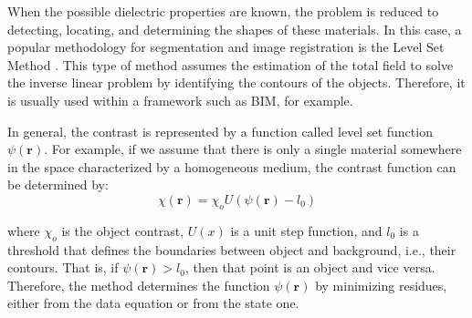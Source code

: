 			When the possible dielectric properties are known, the problem is reduced to detecting, locating, and determining the shapes of these materials. In this case, a popular methodology for segmentation and image registration is the Level Set Method \citep{osher2003level,dorn2006level}. This type of method assumes the estimation of the total field to solve the inverse linear problem by identifying the contours of the objects. Therefore, it is usually used within a framework such as BIM, for example.
			
			In general, the contrast is represented by a function called level set function $\psi(\mathbf{r})$. For example, if we assume that there is only a single material somewhere in the space characterized by a homogeneous medium, the contrast function can be determined by:
			\begin{equation}
				\chi(\mathbf{r}) = \chi_oU(\psi(\mathbf{r})-l_0)  \label{eq:3:deterministic:levelset:0}
			\end{equation}
		
			\noindent where $\chi_o$ is the object contrast, $U(x)$ is a unit step function, and $l_0$ is a threshold that defines the boundaries between object and background, i.e., their contours. That is, if $\psi(\mathbf{r})>l_0$, then that point is an object and vice versa. Therefore, the method determines the function $\psi(\mathbf{r})$ by minimizing residues, either from the data equation or from the state one.
			
